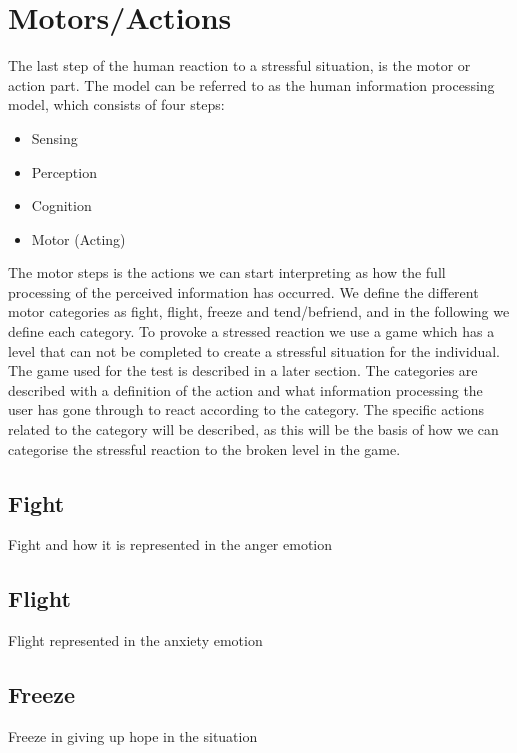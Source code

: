 \section{Motors/Actions}
The last step of the human reaction to a stressful situation, is the motor or action part. The model can be referred to as the human information processing model, which consists of four steps:
\begin{itemize}
\item Sensing
\item Perception
\item Cognition
\item Motor (Acting)
\end{itemize}
The motor steps is the actions we can start interpreting as how the full processing of the perceived information has occurred. We define the different motor categories as fight, flight, freeze and tend/befriend, and in the following we define each category. To provoke a stressed reaction we use a game which has a level that can not be completed to create a stressful situation for the individual. The game used for the test is described in a later section. The categories are described with a definition of the action and what information processing the user has gone through to react according to the category. The specific actions related to the category will be described, as this will be the basis of how we can categorise the stressful reaction to the broken level in the game. %

\subsection{Fight}
Fight and how it is represented in the anger emotion

\subsection{Flight}
Flight represented in the anxiety emotion

\subsection{Freeze}
Freeze in giving up hope in the situation